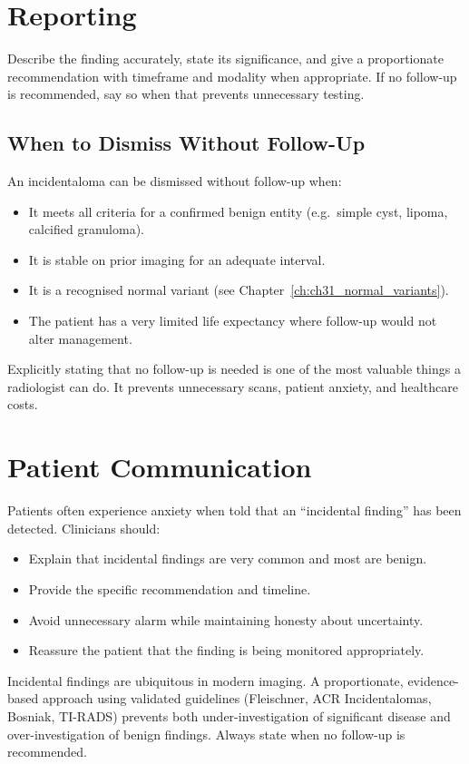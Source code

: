 \section{Reporting}
Describe the finding accurately, state its significance, and give a proportionate recommendation with timeframe and modality when appropriate. If no follow-up is recommended, say so when that prevents unnecessary testing.

\subsection{When to Dismiss Without Follow-Up}
An incidentaloma can be dismissed without follow-up when:
\begin{itemize}
    \item It meets all criteria for a confirmed benign entity (e.g.\ simple cyst, lipoma, calcified granuloma).
    \item It is stable on prior imaging for an adequate interval.
    \item It is a recognised normal variant (see Chapter~\ref{ch:ch31_normal_variants}).
    \item The patient has a very limited life expectancy where follow-up would not alter management.
\end{itemize}

\begin{pearlbox}
Explicitly stating that no follow-up is needed is one of the most valuable things a radiologist can do. It prevents unnecessary scans, patient anxiety, and healthcare costs.
\end{pearlbox}

\section{Patient Communication}
Patients often experience anxiety when told that an ``incidental finding'' has been detected. Clinicians should:
\begin{itemize}
    \item Explain that incidental findings are very common and most are benign.
    \item Provide the specific recommendation and timeline.
    \item Avoid unnecessary alarm while maintaining honesty about uncertainty.
    \item Reassure the patient that the finding is being monitored appropriately.
\end{itemize}

\begin{pearlbox}[Impression:]
Incidental findings are ubiquitous in modern imaging. A proportionate, evidence-based approach using validated guidelines (Fleischner, ACR Incidentalomas, Bosniak, TI-RADS) prevents both under-investigation of significant disease and over-investigation of benign findings. Always state when no follow-up is recommended.
\end{pearlbox}

\clearpage
